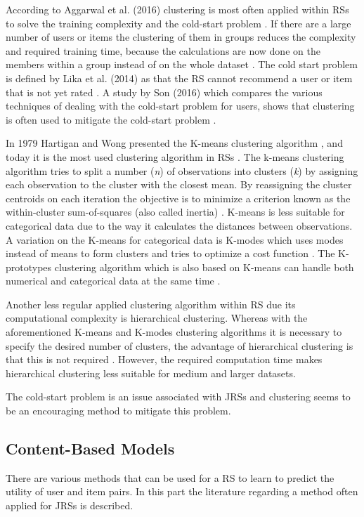 According to Aggarwal et al. (2016) clustering is most often applied within RSs to solve the training complexity and the cold-start problem \cite{aggarwal2016recommender}.
If there are a large number of users or items the clustering of them in groups reduces the complexity and required training time, because the calculations are now done on the members within a group instead of on the whole dataset \cite{aggarwal2016content}.
The cold start problem is defined by Lika et al. (2014) as that the RS cannot recommend a user or item that is not yet rated \cite{lika2014facing}.
A study by Son (2016) which compares the various techniques of dealing with the cold-start problem for users, shows that clustering is often used to mitigate the cold-start problem \cite{son2016dealing}.

In 1979 Hartigan and Wong presented the K-means clustering algorithm \cite{hartigan1979algorithm}, and today it is the most used clustering algorithm in RSs \cite{aggarwal2016recommender}.
The k-means clustering algorithm tries to split a number (\textit{n}) of observations into clusters (\textit{k}) by assigning each observation to the cluster with the closest mean.
By reassigning the cluster centroids on each iteration the objective is to minimize a criterion known as the within-cluster sum-of-squares (also called inertia) \cite{mackay2003example}. 
K-means is less suitable for categorical data due to the way it calculates the distances between observations.
A variation on the K-means for categorical data is K-modes which uses modes instead of means to form clusters and tries to optimize a cost function \cite{huang1997clustering, huang1998extensions}.
The K-prototypes clustering algorithm which is also based on K-means can handle both numerical and categorical data at the same time \cite{huang1997clustering}.

Another less regular applied clustering algorithm within RS due its computational complexity is hierarchical clustering.
Whereas with the aforementioned K-means and K-modes clustering algorithms it is necessary to specify the desired number of clusters, the advantage of hierarchical clustering is that this is not required \cite{rokach2005clustering}.
However, the required computation time makes hierarchical clustering less suitable for medium and larger datasets. 

The cold-start problem is an issue associated with JRSs and clustering seems to be an encouraging method to mitigate this problem.

\subsection{Content-Based Models}
\label{sec:cbm}
There are various methods that can be used for a RS to learn to predict the utility of user and item pairs. 
In this part the literature regarding a method often applied for JRSs is described.

